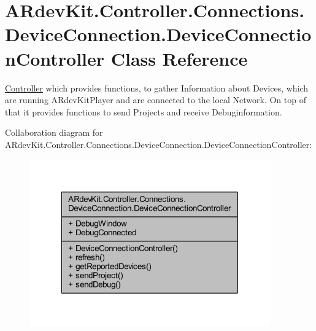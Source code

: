 \hypertarget{class_a_rdev_kit_1_1_controller_1_1_connections_1_1_device_connection_1_1_device_connection_controller}{\section{A\-Rdev\-Kit.\-Controller.\-Connections.\-Device\-Connection.\-Device\-Connection\-Controller Class Reference}
\label{class_a_rdev_kit_1_1_controller_1_1_connections_1_1_device_connection_1_1_device_connection_controller}
}


\hyperlink{namespace_a_rdev_kit_1_1_controller}{Controller} which provides functions, to gather Information about Devices, which are running A\-Rdev\-Kit\-Player and are connected to the local Network. On top of that it provides functions to send Projects and receive Debuginformation.  




Collaboration diagram for A\-Rdev\-Kit.\-Controller.\-Connections.\-Device\-Connection.\-Device\-Connection\-Controller\-:
\nopagebreak
\begin{figure}[H]
\begin{center}
\leavevmode
\includegraphics[width=294pt]{class_a_rdev_kit_1_1_controller_1_1_connections_1_1_device_connection_1_1_device_connection_controller__coll__graph}
\end{center}
\end{figure}
